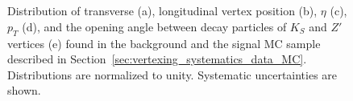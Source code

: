 \begin{figure}[!htb]
    \centering
     \\
     \\
    \caption{Distribution of transverse (a), longitudinal vertex position (b), $\eta$ (c), $p_{T}$ (d), and the opening angle between decay particles of $K_{S}$ and $Z'$ vertices (e) found in the background and the signal MC sample described in Section~\ref{sec:vertexing_systematics_data_MC}. Distributions are normalized to unity. Systematic uncertainties are shown.}
    \label{fig:Ks_zp_comparison}
\end{figure}

